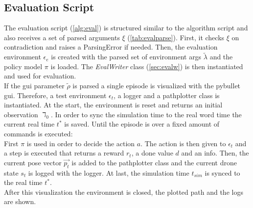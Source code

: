\subsection{Evaluation Script}
The evaluation script (\cref{alg:eval}) is structured similar to the algorithm script and also receives a set of
parsed arguments $\xi$ (\cref{tab:evalparse}). 
First, it checks $\xi$ on contradiction and raises a ParsingError if needed. 
Then, the evaluation environment $\epsilon_e$ is created with the parsed set of environment args $\tilde{\lambda}$ and the policy model $\pi$ is loaded. 
The \emph{EvalWriter} class (\cref{sec:evalw}) is then instantiated and used for evaluation.\\
If the gui parameter $\tilde{\rho}$ is parsed a single episode is visualized with the pybullet gui. 
Therefore, a test environment $\epsilon_t$, a logger and a pathplotter class is instantiated.
At the start, the environment is reset and returns an initial observation $\daleth_0$. 
In order to sync the simulation time to the real word time the current real time $t^*$ is saved.
Until the episode is over a fixed amount of commands is executed:\\
First $\pi$ is used in order to decide the action $a$. 
The action is then given to $\epsilon_t$ and a step is executed that returns a reward $r_t$, a done value $d$ and an info.
Then, the current pose vector $\overrightarrow{p_t}$ is added to the pathplotter class and the current drone state $s_t$ is logged with the logger. 
At last, the simulation time $t_{sim}$ is synced to the real time $t^*$.\\
After this visualization the environment is closed, the plotted path and the logs are shown.

